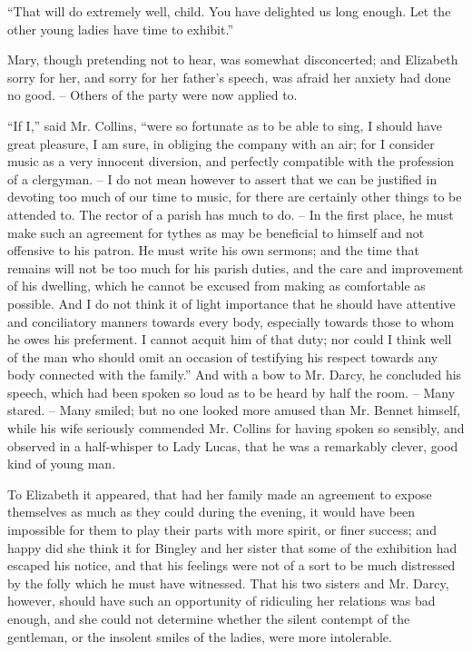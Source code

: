“That will do extremely well, child. You have delighted
us long enough. Let the other young ladies have time
to exhibit.”

Mary, though pretending not to hear, was somewhat
disconcerted; and Elizabeth sorry for her, and sorry for
her father’s speech, was afraid her anxiety had done no
good. -- Others of the party were now applied to.

“If I,” said Mr. Collins, “were so fortunate as to be
able to sing, I should have great pleasure, I am sure, in
obliging the company with an air; for I consider music
as a very innocent diversion, and perfectly compatible
with the profession of a clergyman. -- I do not mean however
to assert that we can be justified in devoting too much
of our time to music, for there are certainly other things
to be attended to. The rector of a parish has much to do. --
In the first place, he must make such an agreement for
tythes as may be beneficial to himself and not offensive
to his patron. He must write his own sermons; and the
time that remains will not be too much for his parish
duties, and the care and improvement of his dwelling,
which he cannot be excused from making as comfortable
as possible. And I do not think it of light importance that
he should have attentive and conciliatory manners towards
every body, especially towards those to whom he owes
his preferment. I cannot acquit him of that duty; nor
could I think well of the man who should omit an occasion
of testifying his respect towards any body connected with
the family.” And with a bow to Mr. Darcy, he concluded
his speech, which had been spoken so loud as to be heard
by half the room. -- Many stared. -- Many smiled; but no
one looked more amused than Mr. Bennet himself, while
his wife seriously commended Mr. Collins for having spoken
so sensibly, and observed in a half-whisper to Lady Lucas,
that he was a remarkably clever, good kind of young man.

To Elizabeth it appeared, that had her family made
an agreement to expose themselves as much as they
could during the evening, it would have been impossible
for them to play their parts with more spirit, or finer
success; and happy did she think it for Bingley and her
sister that some of the exhibition had escaped his notice,
and that his feelings were not of a sort to be much distressed
by the folly which he must have witnessed. That
his two sisters and Mr. Darcy, however, should have such
an opportunity of ridiculing her relations was bad enough,
and she could not determine whether the silent contempt
of the gentleman, or the insolent smiles of the ladies, were
more intolerable.

